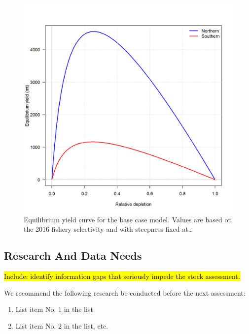 \documentclass[12pt,]{article}
\begin{document}
\begin{figure}[htbp]
\centering
\includegraphics{r4ss/plots_compare/yield_comparison_n_models.png}
\caption{Equilibrium yield curve for the base case model. Values are
based on the 2016 fishery selectivity and with steepness fixed
at\ldots{} \label{fig:Yield_all}}
\end{figure}

\FloatBarrier

\newpage

\subsection*{Research And Data Needs}\label{research-and-data-needs}

\hl{Include: identify information gaps that seriously impede the stock assessment.}

We recommend the following research be conducted before the next
assessment:

\begin{enumerate}

\item List item No. 1 in the list

\item List item No. 2 in the list, etc.

\end{enumerate}
\end{document}
